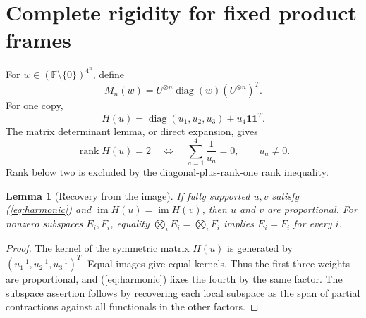 \documentclass[11pt,letterpaper]{article}
\newtheorem{lemma}[theorem]{Lemma}
\theoremstyle{definition}\newtheorem{definition}[theorem]{Definition}
\theoremstyle{remark}\newtheorem{remark}[theorem]{Remark}
\DeclareMathOperator{\rank}{rank}
\DeclareMathOperator{\im}{im}
\DeclareMathOperator{\diag}{diag}
\newcommand{\F}{\mathbb F}
\newcommand{\one}{\mathbf 1}
\begin{document}
\section{Complete rigidity for fixed product frames}
For $w\in(\F\setminus\{0\})^{4^n}$, define
\[
M_n(w)=U^{\otimes n}\diag(w)(U^{\otimes n})^T.
\]
For one copy,
\begin{equation}\label{eq:H}
H(u)=\diag(u_1,u_2,u_3)+u_4\one\one^T.
\end{equation}
The matrix determinant lemma, or direct expansion, gives
\begin{equation}\label{eq:harmonic}
\rank H(u)=2\quad\Longleftrightarrow\quad
\sum_{a=1}^{4}\frac1{u_a}=0,
\qquad u_a\ne0.
\end{equation}
Rank below two is excluded by the diagonal-plus-rank-one rank inequality.

\begin{lemma}[Recovery from the image]\label{lem:image}
If fully supported $u,v$ satisfy (\ref{eq:harmonic}) and $\im H(u)=\im H(v)$, then $u$ and $v$ are proportional. For nonzero subspaces $E_i,F_i$, equality $\bigotimes_i E_i=\bigotimes_i F_i$ implies $E_i=F_i$ for every $i$.
\end{lemma}
\begin{proof}
The kernel of the symmetric matrix $H(u)$ is generated by $(u_1^{-1},u_2^{-1},u_3^{-1})^T$. Equal images give equal kernels. Thus the first three weights are proportional, and (\ref{eq:harmonic}) fixes the fourth by the same factor. The subspace assertion follows by recovering each local subspace as the span of partial contractions against all functionals in the other factors.
\end{proof}
\end{document}
